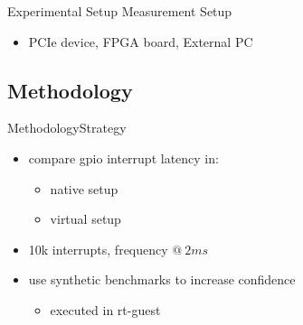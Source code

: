 \documentclass[10pt,hyperref={hyperfootnotes=false}, xcolor={usenames, dvipsnames}]{beamer}
\begin{document}
\begin{frame}{Experimental Setup} {Measurement Setup}
  \begin{itemize}
  \item {PCIe device, FPGA board, External PC}  \pause{}
	\begingroup
	
	\endgroup
  \end{itemize}
\end{frame}

\subsection{Methodology}
\begin{frame}{Methodology}{Strategy}
    \begin{itemize}
		\item{compare gpio interrupt latency in: 
				\begin{itemize}
				  \item {native setup} 
				  \item {virtual setup}
				\end{itemize}
            }   \pause{}
        \item{10k interrupts, frequency $@~2ms$} \pause{}
        \item{use synthetic benchmarks to increase confidence} \pause{}
			\begin{itemize}
				\item {executed in rt-guest}
			\end{itemize}
    \end{itemize}
\end{frame}
\end{document}
